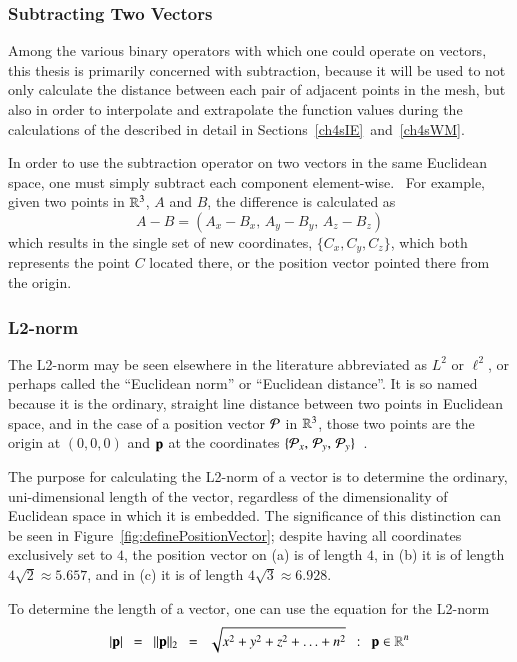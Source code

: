 %
%
\subsubsection{Subtracting Two Vectors}
\label{ch2sETBssLAsssS2V}
Among the various binary operators with which one could operate on vectors, this thesis is primarily concerned with subtraction, because it will be used to not only calculate the distance between each pair of adjacent points in the mesh, but also in order to interpolate and extrapolate the function values during the calculations of the  described in detail in Sections~\ref{ch4sIE}~and~\ref{ch4sWM}.

In order to use the subtraction operator on two vectors in the same Euclidean space, one must simply subtract each component element-wise.~\cite{Weisstein19j} For example, given two points in $\mathbb{R}^{3}$, $A$ and $B$, the difference is calculated as
%
\begin{equation}
	A - B = (A_x - B_x,\,A_y - B_y,\,A_z - B_z)
	\label{eq:vectorSubtraction}
\end{equation}
%
which results in the single set of new coordinates, $\{C_x, C_y, C_z\}$, which both represents the point $C$ located there, or the position vector pointed there from the origin.

%
%
\subsubsection{L2-norm}
\label{ch2sETBssLAsssL2N}
The L2-norm may be seen elsewhere in the literature abbreviated as $L^2$ or $\ell^2$, or perhaps called the ``Euclidean norm'' or ``Euclidean distance''. It is so named because it is the ordinary, straight line distance between two points in Euclidean space, and in the case of a position vector $\mathcal{P}$ in $\mathbb{R}^{3}$, those two points are the origin at $(0, 0, 0)$ and $\mathbf{p}$ at the coordinates $\{\mathcal{P}_x,\,\mathcal{P}_y,\,\mathcal{P}_y\}$~\cite{Weisstein19h}.

The purpose for calculating the L2-norm of a vector is to determine the ordinary, uni-dimensional length of the vector, regardless of the dimensionality of Euclidean space in which it is embedded. The significance of this distinction can be seen in Figure~\ref{fig:definePositionVector}; despite having all coordinates exclusively set to $4$, the position vector on (a) is of length $4$, in (b) it is of length $4\sqrt{2} \approx 5.657$, and in (c) it is of length $4\sqrt{3} \approx 6.928$.

To determine the length of a vector, one can use the equation for the L2-norm
\begin{equation}
	|\mathbf{p}| \enspace=\enspace \|\mathbf{p}\|_2 \enspace=\enspace \sqrt{x^2 + y^2 + z^2 + \ldots + n^2} \enspace:\enspace \mathbf{p} \in \mathbb{R}^{n}
	\label{eq:l2norm}
\end{equation}

